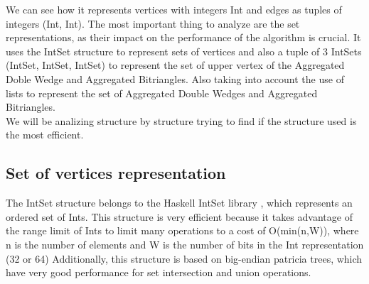 We can see how it represents vertices with integers Int and edges as tuples of integers (Int, Int).
The most important thing to analyze are the set representations, as their impact on the performance of the algorithm is crucial.
It uses the IntSet structure to represent sets of vertices and also a tuple of 3 IntSets (IntSet, IntSet, IntSet) to represent the set of upper vertex of the Aggregated Doble Wedge and Aggregated Bitriangles. \cite[][Page52]{}
Also taking into account the use of lists to represent the set of Aggregated Double Wedges and Aggregated Bitriangles. \\

We will be analizing structure by structure trying to find if the structure used is the most efficient.
\subsection{Set of vertices representation}
The IntSet structure belongs to the Haskell IntSet library \cite[][]{}, which represents an ordered set of Ints.
This structure is very efficient because it takes advantage of the range limit of Ints to limit many operations to a cost of O(min(n,W)), where n is the number of elements and W is the number of bits in the Int representation (32 or 64)
Additionally, this structure is based on big-endian patricia trees, which have very good performance for set intersection and union operations.

